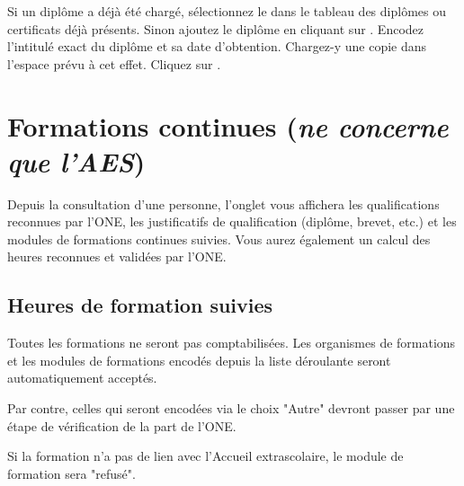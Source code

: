 Si un diplôme a déjà été chargé, sélectionnez le dans le tableau des diplômes ou certificats déjà présents.
Sinon ajoutez le diplôme en cliquant sur . Encodez l'intitulé exact du diplôme et sa date d'obtention. Chargez-y une copie dans l'espace prévu à cet effet. Cliquez sur .


\section{Formations continues (\textit{ne concerne que l'AES})}\label{sec:form_cont}
Depuis la consultation d'une personne, l'onglet  vous affichera les qualifications reconnues par l'ONE, les justificatifs de qualification (diplôme, brevet, etc.) et les modules de formations continues suivies. Vous aurez également un calcul des heures reconnues et validées par l'ONE. 

\subsection{Heures de formation suivies}
Toutes les formations ne seront pas comptabilisées. Les organismes de formations et les modules de formations encodés depuis la liste déroulante seront automatiquement acceptés.

Par contre, celles qui seront encodées via le choix "Autre" devront passer par une étape de vérification de la part de l'ONE. 

Si la formation n'a pas de lien avec l'Accueil extrascolaire, le module de formation sera "refusé".


